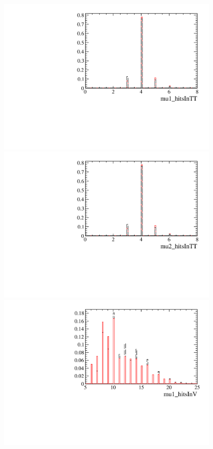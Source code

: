 \documentclass[12pt,a4paper]{article}
\begin{document}
\begin{figure} [htb!]
\begin{center}
\includegraphics[scale=0.20]{figs/mu1_hitsInTTPARTIALptcut.pdf}
\includegraphics[scale=0.20]{figs/mu2_hitsInTTPARTIALptcut.pdf}
\includegraphics[scale=0.20]{figs/mu1_hitsInVPARTIALptcut.pdf}

\end{center}
\end{figure}
\end{document}
